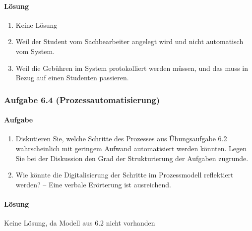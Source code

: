     \paragraph*{Lösung}
        \begin{enumerate}[label=\alph*)]
            \item Keine Lösung
            \item Weil der Student vom Sachbearbeiter angelegt wird und nicht automatisch vom System.
            \item Weil die Gebühren im System protokolliert werden müssen, und das muss in Bezug auf einen Studenten passieren.
        \end{enumerate}

\subsubsection*{Aufgabe 6.4 (Prozessautomatisierung)}
    \paragraph*{Aufgabe}
        \begin{enumerate}[label=\alph*)]
            \item Diskutieren Sie, welche Schritte des Prozesses aus Übungsaufgabe 6.2 wahrscheinlich mit geringem Aufwand automatisiert werden könnten. Legen Sie bei der Diskussion den Grad der Strukturierung der Aufgaben zugrunde.
            \item Wie könnte die Digitalisierung der Schritte im Prozessmodell reflektiert werden? – Eine verbale Erörterung ist ausreichend.
        \end{enumerate}

    \paragraph*{Lösung}
        Keine Lösung, da Modell aus 6.2 nicht vorhanden